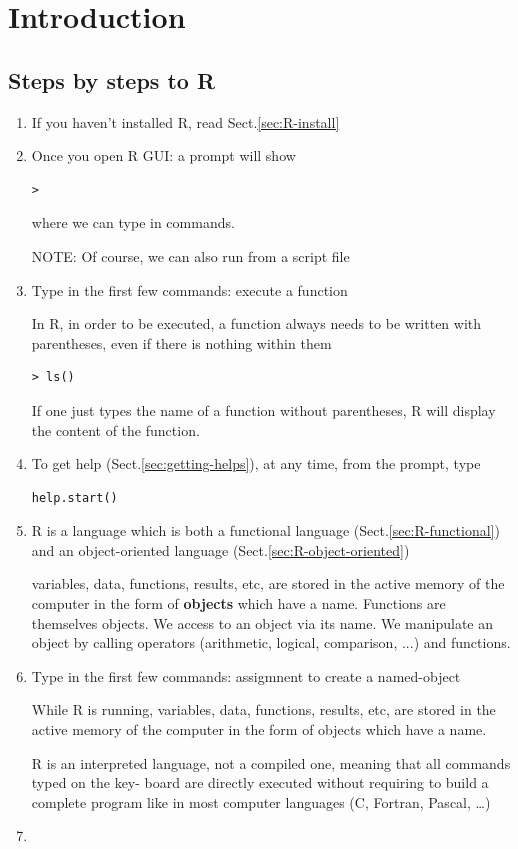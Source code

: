 
\chapter{Introduction}
\label{chap:introduction}

\section{Steps by steps to R}

\begin{enumerate}
  \item If you haven't installed R, read Sect.\ref{sec:R-install}
  
  \item Once you open R GUI: a prompt will show 
\begin{verbatim}
>
\end{verbatim}
where we can type in commands. 

NOTE: Of course, we can also run from a script file


  \item Type in the first few commands: execute a function

In R, in order to be executed, a function always needs to be written with parentheses, even if there is nothing within them
\begin{verbatim}
> ls()
\end{verbatim}

If one just types the name of a function without parentheses, R will display the content of the function.

  \item To get help (Sect.\ref{sec:getting-helps}), at any time, from the
  prompt, type
\begin{verbatim}
help.start()
\end{verbatim}
  
  \item R is a language which is both a functional language
  (Sect.\ref{sec:R-functional}) and an object-oriented language
  (Sect.\ref{sec:R-object-oriented})
  
variables, data, functions, results, etc, are stored in the active memory of the
computer in the form of {\bf objects} which have a name.
Functions  are themselves objects. We access to an object via its name. We
manipulate an object by calling operators (arithmetic, logical, comparison, ...)
and functions.


  \item Type in the first few commands: assigmnent to create a named-object
  
While R is running, variables, data, functions, results, etc, are stored in the
active memory of the computer in the form of objects which have a name.

  

R is an interpreted language, not a compiled one, meaning that all commands
typed on the key- board are directly executed without requiring to build a
complete program like in most computer languages (C, Fortran, Pascal, \ldots)

  \item 

\end{enumerate}


